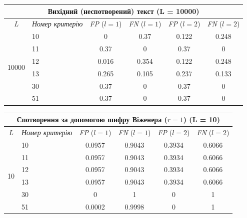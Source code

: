 \documentclass[a4paper,12pt]{article}
\begin{document}
\begin{center}
\renewcommand{\arraystretch}{1.2}
\setlength{\tabcolsep}{6pt}
\begin{tabular}{|c|l||c|c||c|c|}
\hline
\multicolumn{6}{|c|}{Вихідний (неспотворений) текст (L = 10000)} \\
\hline
\textit{L} & \textit{Номер критерію} & \textit{FP} ($l=1$) & \textit{FN} ($l=1$) & \textit{FP} ($l=2$) & \textit{FN} ($l=2$) \\
\hline
\multirow{6}{*}{10000} & 10 & 0 & 0.37 & 0.122 & 0.248 \\
 & 11 & 0.37 & 0 & 0.37 & 0 \\
 & 12 & 0.016 & 0.354 & 0.122 & 0.248 \\
 & 13 & 0.265 & 0.105 & 0.237 & 0.133 \\
 & 30 & 0.37 & 0 & 0.37 & 0 \\
 & 51 & 0.37 & 0 & 0.37 & 0 \\
\hline
\end{tabular}
\end{center}

\begin{center}
\renewcommand{\arraystretch}{1.2}
\setlength{\tabcolsep}{6pt}
\begin{tabular}{|c|l||c|c||c|c|}
\hline
\multicolumn{6}{|c|}{Спотворення за допомогою шифру Віженера ($r = 1$) (L = 10)} \\
\hline
\textit{L} & \textit{Номер критерію} & \textit{FP} ($l=1$) & \textit{FN} ($l=1$) & \textit{FP} ($l=2$) & \textit{FN} ($l=2$) \\
\hline
\multirow{6}{*}{10} & 10 & 0.0957 & 0.9043 & 0.3934 & 0.6066 \\
 & 11 & 0.0957 & 0.9043 & 0.3934 & 0.6066 \\
 & 12 & 0.0957 & 0.9043 & 0.3934 & 0.6066 \\
 & 13 & 0.0957 & 0.9043 & 0.3934 & 0.6066 \\
 & 30 & 0 & 1 & 0 & 1 \\
 & 51 & 0.0002 & 0.9998 & 0 & 1 \\
\hline
\end{tabular}
\end{center}
\end{document}
